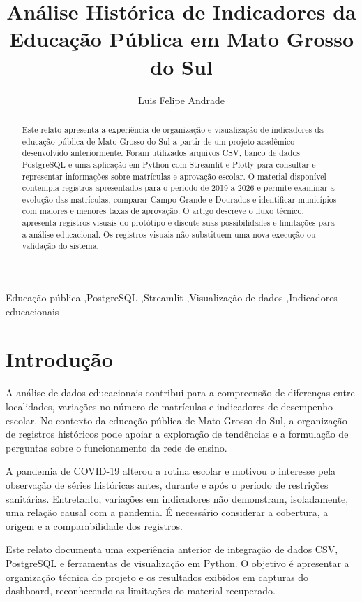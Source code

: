 \documentclass[preprint,10pt,5p]{elsarticle}
\begin{document}
\begin{frontmatter}
\title{Análise Histórica de Indicadores da Educação Pública em Mato Grosso do Sul}
\author[ucdb]{Luis Felipe Andrade}
\address[ucdb]{Universidade Católica Dom Bosco, Campo Grande, Mato Grosso do Sul, Brasil}

\begin{abstract}
Este relato apresenta a experiência de organização e visualização de indicadores da educação pública de Mato Grosso do Sul a partir de um projeto acadêmico desenvolvido anteriormente. Foram utilizados arquivos CSV, banco de dados PostgreSQL e uma aplicação em Python com Streamlit e Plotly para consultar e representar informações sobre matrículas e aprovação escolar. O material disponível contempla registros apresentados para o período de 2019 a 2026 e permite examinar a evolução das matrículas, comparar Campo Grande e Dourados e identificar municípios com maiores e menores taxas de aprovação. O artigo descreve o fluxo técnico, apresenta registros visuais do protótipo e discute suas possibilidades e limitações para a análise educacional. Os registros visuais não substituem uma nova execução ou validação do sistema.
\end{abstract}
\begin{keyword}
Educação pública \sep PostgreSQL \sep Streamlit \sep Visualização de dados \sep Indicadores educacionais
\end{keyword}
\end{frontmatter}

\section{Introdução}
A análise de dados educacionais contribui para a compreensão de diferenças entre localidades, variações no número de matrículas e indicadores de desempenho escolar. No contexto da educação pública de Mato Grosso do Sul, a organização de registros históricos pode apoiar a exploração de tendências e a formulação de perguntas sobre o funcionamento da rede de ensino.

A pandemia de COVID-19 alterou a rotina escolar e motivou o interesse pela observação de séries históricas antes, durante e após o período de restrições sanitárias. Entretanto, variações em indicadores não demonstram, isoladamente, uma relação causal com a pandemia. É necessário considerar a cobertura, a origem e a comparabilidade dos registros.

Este relato documenta uma experiência anterior de integração de dados CSV, PostgreSQL e ferramentas de visualização em Python. O objetivo é apresentar a organização técnica do projeto e os resultados exibidos em capturas do dashboard, reconhecendo as limitações do material recuperado.
\end{document}
